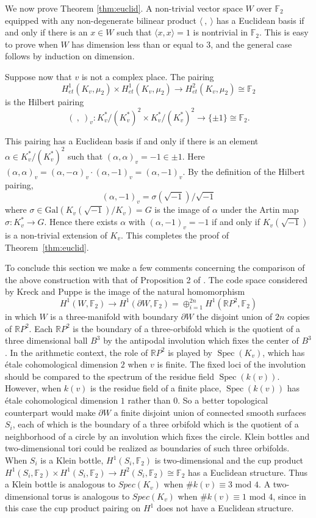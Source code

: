 \documentclass[noams]{compositio}
\theoremstyle{definition} %
\theoremstyle{remark} %
\DeclareMathOperator{\Spec}{\mathrm{Spec}}
\newcommand{\F}{\mathbb{F}}
\newcommand{\R}{\mathbb{R}}
\begin{document}
We now prove Theorem \ref{thm:euclid}. A non-trivial vector space $W$ over $\F_2$ equipped with any non-degenerate bilinear product $\langle \ , \ \rangle$ has a Euclidean basis if and only if there is an $x \in W$ such that $\langle x, x\rangle=1$ is nontrivial in $\F_2$. This is easy to prove when $W$ has dimension less than or equal to $3$, and the general case follows by induction on dimension. 

Suppose now that $v$ is not a complex place.  The pairing
$$H^1_{et}(K_v, \mu_2) \times H^1_{et}(K_v,\mu_2) \to H^2_{et}(K_v,\mu_2) \cong \F_2$$
is the Hilbert pairing
$$(\ , \ )_v: K_v^*/(K_v^*)^2 \times K_v^*/(K_v^*)^2 \to \{\pm 1\} \cong \F_2.$$

This pairing has a Euclidean basis if and only if there is an element $\alpha \in K_v^*/(K_v^*)^2$
such that $(\alpha,\alpha)_v = -1 \in \pm 1$. Here $(\alpha,\alpha)_v =
(\alpha,-\alpha)_v \cdot (\alpha,-1)_v = (\alpha,-1)_v$.  By the definition of
the Hilbert pairing, $$(\alpha,-1)_v = \sigma(\sqrt{-1})/\sqrt{-1}$$
where $\sigma \in \mathrm{Gal}(K_v(\sqrt{-1})/K_v) = G$ is the image of $\alpha$
under the Artin map $\sigma: K_v^* \to  G$.  Hence there exists $\alpha$ with $(\alpha,-1)_v  = -1$ if and only
if $K_v(\sqrt{-1})$ is a non-trivial extension of $K_v$. This completes the proof of Theorem~\ref{thm:euclid}.

To conclude this section we make a few comments concerning the comparison of
the above construction with that of Proposition 2  of \cite{Kreck2008}.  The
code space considered by Kreck and Puppe is the image of the natural homomorphism
$$H^1(W,\F_2) \to H^1(\partial W,\F_2) = \oplus_{i = 1}^{2n} H^1(\R P^2,\F_2)$$
in which $W$ is a three-manifold with boundary  $\partial W$ the disjoint union
of $2n$ copies of $\R P^2$.  Each $\R P^2$ is the boundary of a three-orbifold
which is the quotient of a three dimensional ball $B^3$ by the antipodal involution which fixes
the center of $B^3$.   In the arithmetic context, the role of $\R P^2$ is played
by $\Spec(K_v)$, which has \'etale cohomological dimension $2$ when $v$ is
finite. The fixed loci of the involution should be compared to the spectrum of the residue field $\Spec(k(v))$. However, when $k(v)$ is the residue field of a finite place, $\Spec(k(v))$ has \'etale
cohomological dimension $1$ rather than $0$. So a better topological counterpart %
would make $\partial W$ a  finite disjoint union of connected smooth surfaces $S_i$, each of which
is the boundary of a three orbifold which is the quotient of a neighborhood
of a circle by an involution which fixes the circle. Klein bottles and two-dimensional tori could be realized as boundaries of such three orbifolds. When $S_i$ is a Klein bottle, $H^1(S_i,\F_2)$ is two-dimensional and the cup product
$H^1(S_i,\F_2) \times H^1(S_i,\F_2) \to H^2(S_i,\F_2) \cong \F_2$
has a Euclidean structure. Thus  a Klein bottle is analogous to $Spec(K_v)$ when $\# k(v) \equiv 3$ mod $4$. A two-dimensional torus is analogous to $Spec(K_v)$ when $\# k(v) \equiv 1$ mod $4$, since in this case the cup product pairing
on $H^1$ does not have a Euclidean structure.
\end{document}
